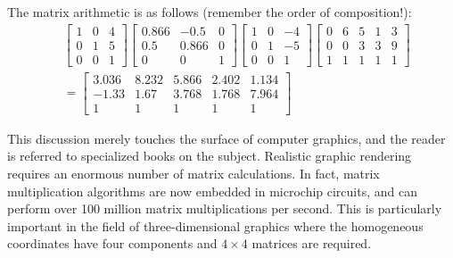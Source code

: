 \documentclass{ximera}
\begin{document}
\begin{example}
\begin{explanation}
    
\begin{onlineOnly}
\begin{center}
\end{center}
\end{onlineOnly}
    
The matrix arithmetic is as follows (remember the order of composition!):
\begin{align*}
& \left[
\begin{array}{rrr}
1 & 0 & 4\\
0 & 1 & 5\\
0 & 0 & 1
\end{array}
\right]
\left[
\begin{array}{lrr}
0.866 & -0.5 & 0\\
0.5 & 0.866 & 0\\
0 & 0 & 1
\end{array}
\right]
\left[
\begin{array}{rrr}
1 & 0 & -4\\
0 & 1 & -5\\
0 & 0 & 1
\end{array}
\right]
\left[
\begin{array}{rrrrr}
0 & 6 & 5 & 1 & 3\\
0 & 0 & 3 & 3 & 9 \\
1 & 1 & 1 & 1 & 1
\end{array}
\right] \\
&= \left[
\begin{array}{lllll}
3.036 & 8.232 & 5.866 & 2.402 & 1.134\\
-1.33 & 1.67 & 3.768 & 1.768 & 7.964 \\
1 & 1 & 1 & 1 & 1
\end{array}
\right]
\end{align*}
    
\end{explanation}
\end{example}
    
This discussion merely touches the
surface of computer graphics, and the reader is referred to specialized
books on the subject. Realistic graphic rendering requires an enormous
number of matrix calculations. In fact, matrix multiplication algorithms
    are now embedded in microchip circuits, and can perform over 100
million matrix multiplications per second. This is particularly
important in the field of three-dimensional graphics where the
homogeneous coordinates have four components and $4 \times 4$ matrices are
required.
    
\end{document}
